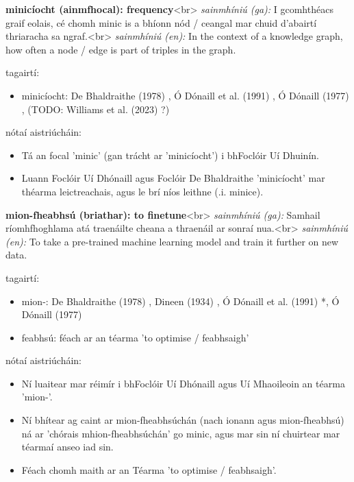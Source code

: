 \documentclass{article}
\begin{document}
\textbf{minicíocht (ainmfhocal): frequency}<br>
\textit{sainmhíniú (ga):} I gcomhthéacs graif eolais, cé chomh minic is a bhíonn nód / ceangal mar chuid d'abairtí thriaracha sa ngraf.<br>
\textit{sainmhíniú (en):} In the context of a knowledge graph, how often a node / edge is part of triples in the graph.

tagairtí:
\begin{itemize}
	\item minicíocht: De Bhaldraithe (1978) \cite{de-bhaldraithe}, Ó Dónaill et al. (1991) \cite{focloir-beag}, Ó Dónaill (1977) \cite{odonaill}, (TODO: Williams et al. (2023) \cite{storchiste}?)
\end{itemize}

nótaí aistriúcháin:
\begin{itemize}
	\item Tá an focal 'minic' (gan trácht ar 'minicíocht') i bhFoclóir Uí Dhuinín.
	\item Luann Foclóir Uí Dhónaill agus Foclóir De Bhaldraithe 'minicíocht' mar théarma leictreachais, agus le brí níos leithne (.i. minice).
\end{itemize}


\textbf{mion-fheabhsú (briathar): to finetune}<br>
\textit{sainmhíniú (ga):} Samhail ríomhfhoghlama atá traenáilte cheana a thraenáil ar sonraí nua.<br>
\textit{sainmhíniú (en):} To take a pre-trained machine learning model and train it further on new data.

tagairtí:
\begin{itemize}
	\item mion-: De Bhaldraithe (1978) \cite{de-bhaldraithe}, Dineen (1934) \cite{dineen}, Ó Dónaill et al. (1991) \cite{focloir-beag}*, Ó Dónaill (1977) \cite{odonaill}
	\item feabhsú: féach ar an téarma 'to optimise / feabhsaigh'
\end{itemize}

nótaí aistriúcháin:
\begin{itemize}
	\item Ní luaitear mar réimír i bhFoclóir Uí Dhónaill agus Uí Mhaoileoin an téarma 'mion-'.
	\item Ní bhítear ag caint ar mion-fheabhsúchán (nach ionann agus mion-fheabhsú) ná ar 'chórais mhion-fheabhsúchán' go minic, agus mar sin ní chuirtear mar téarmaí anseo iad sin.
	\item Féach chomh maith ar an Téarma 'to optimise / feabhsaigh'.
\end{itemize}
\end{document}
